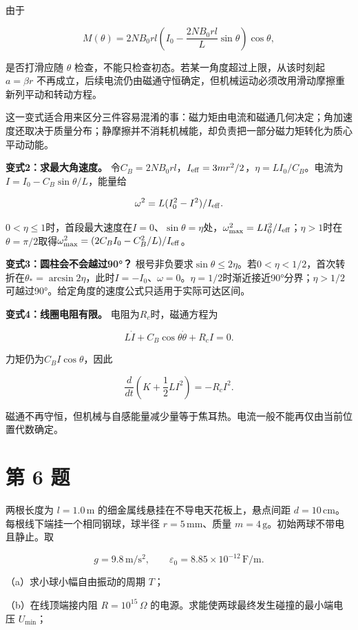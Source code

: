 \documentclass[12pt,a4paper,UTF8]{ctexart}
\begin{document}
由于

\[
M(\theta)=2NB_0rl
\left(I_0-\frac{2NB_0rl}{L}\sin\theta\right)
\cos\theta,
\]

是否打滑应随 \(\theta\)
检查，不能只检查初态。若某一角度超过上限，从该时刻起 \(a=\beta r\)
不再成立，后续电流仍由磁通守恒确定，但机械运动必须改用滑动摩擦重新列平动和转动方程。

这一变式适合用来区分三件容易混淆的事：磁力矩由电流和磁通几何决定；角加速度还取决于质量分布；静摩擦并不消耗机械能，却负责把一部分磁力矩转化为质心平动动能。

\textbf{变式2：求最大角速度。}
令\(C_B=2NB_0rl\)，\(I_{\rm eff}=3mr^2/2\)，\(\eta=LI_0/C_B\)。电流为\(I=I_0-C_B\sin\theta/L\)，能量给

\[\omega^2=L(I_0^2-I^2)/I_{\rm eff}.\]

\(0<\eta\le1\)时，首段最大速度在\(I=0\)、\(\sin\theta=\eta\)处，\(\omega_{\max}^2=LI_0^2/I_{\rm eff}\)；\(\eta>1\)时在\(\theta=\pi/2\)取得\(\omega_{\max}^2=(2C_BI_0-C_B^2/L)/I_{\rm eff}\)。

\textbf{变式3：圆柱会不会越过90°？}
根号非负要求\(\sin\theta\le2\eta\)。若\(0<\eta<1/2\)，首次转折在\(\theta_* =\arcsin2\eta\)，此时\(I=-I_0\)、\(\omega=0\)。\(\eta=1/2\)时渐近接近90°分界；\(\eta>1/2\)可越过90°。给定角度的速度公式只适用于实际可达区间。

\textbf{变式4：线圈电阻有限。} 电阻为\(R_c\)时，磁通方程为

\[L\dot I+C_B\cos\theta\dot\theta+R_cI=0.\]

力矩仍为\(C_BI\cos\theta\)，因此

\[\frac d{dt}\left(K+\frac12LI^2\right)=-R_cI^2.\]

磁通不再守恒，但机械与自感能量减少量等于焦耳热。电流一般不能再仅由当前位置代数确定。

\newpage

\section{第 6 题}\label{ux7b2c-6-ux9898}

两根长度为 \(l=1.0\,\mathrm m\) 的细金属线悬挂在不导电天花板上，悬点间距
\(d=10\,\mathrm{cm}\)。每根线下端挂一个相同钢球，球半径
\(r=5\,\mathrm{mm}\)、质量 \(m=4\,\mathrm g\)。初始两球不带电且静止。取

\[
g=9.8\,\mathrm{m/s^2},
\qquad
\varepsilon_0=8.85\times10^{-12}\,\mathrm{F/m}.
\]

（a）求小球小幅自由振动的周期 \(T\)；

（b）在线顶端接内阻 \(R=10^{15}\,\Omega\)
的电源。求能使两球最终发生碰撞的最小端电压 \(U_{\min}\)；
\end{document}
